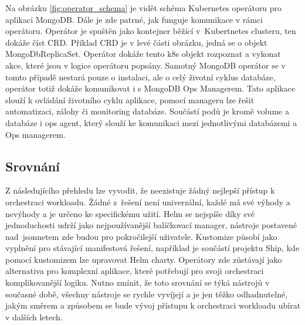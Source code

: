 Na obrázku \ref{fig:operator_schema} je vidět schéma Kubernetes operátoru pro aplikaci MongoDB. Dále je zde patrné, jak funguje komunikace v rámci operátoru. Operátor je spuštěn jako kontejner běžící v Kubertnetes clusteru, ten dokáže číst CRD. Příklad CRD je v levé části obrázku, jedná se o objekt MongoDbReplicaSet. Operátor dokáže tento k8s objekt rozpoznat a vykonat akce, které jsou v logice operátoru popsány. Samotný MongoDB operátor se v tomto případě nestará pouze o instalaci, ale o celý životní cyklus databáze, operátor totiž dokáže komunikovat i s MongoDB Ops Managerem. Tato aplikace slouží k ovládání životního cyklu aplikace, pomocí manageru lze řešit automatizaci, zálohy či monitoring databáze. Součástí podů je kromě volume a databáze i ops agent, který slouží ke komunikaci mezi jednotlivými databázemi a Ops managerem.

\subsection{Srovnání}
Z následujícího přehledu lze vyvodit, že neexistuje žádný nejlepší přístup k orchestraci workloadu. Žádné z řešení není univerzální, každé má své výhody a nevýhody a je určeno ke specifickému užití. Helm se nejspíše díky své jednoduchosti udrží jako nejpoužívanější balíčkovací manager, nástroje postavené nad jsonnetem zde budou pro pokročilejší uživatele. Kustomize působí jako vyplnění pro stávající manifestová řešení, například je součástí projektu Ship, kde pomocí kustomizem lze upravovat Helm charty. Operátory zde zůstávají jako alternativa pro komplexní aplikace, které potřebují pro svoji orchestraci komplikovanější logiku. Nutno zmínit, že toto srovnání se týká nástrojů v současné době, všechny nástroje se rychle vyvíjejí a je jen těžko odhadnutelné, jakým směrem a způsobem se bude vývoj přístupu k orchestraci workloadu ubírat v dalších letech.

